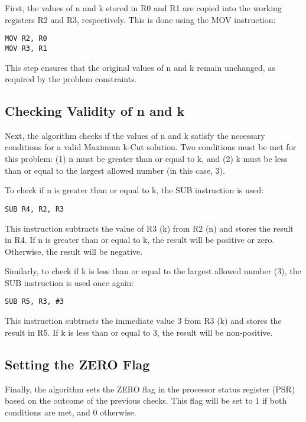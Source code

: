 First, the values of n and k stored in R0 and R1 are copied into the working registers R2 and R3, respectively. This is done using the MOV instruction:

\begin{verbatim}
MOV R2, R0
MOV R3, R1
\end{verbatim}

This step ensures that the original values of n and k remain unchanged, as required by the problem constraints.

\subsection{Checking Validity of n and k}

Next, the algorithm checks if the values of n and k satisfy the necessary conditions for a valid Maximum k-Cut solution. Two conditions must be met for this problem: (1) n must be greater than or equal to k, and (2) k must be less than or equal to the largest allowed number (in this case, 3).

To check if n is greater than or equal to k, the SUB instruction is used:

\begin{verbatim}
SUB R4, R2, R3
\end{verbatim}

This instruction subtracts the value of R3 (k) from R2 (n) and stores the result in R4. If n is greater than or equal to k, the result will be positive or zero. Otherwise, the result will be negative.

Similarly, to check if k is less than or equal to the largest allowed number (3), the SUB instruction is used once again:

\begin{verbatim}
SUB R5, R3, #3
\end{verbatim}

This instruction subtracts the immediate value 3 from R3 (k) and stores the result in R5. If k is less than or equal to 3, the result will be non-positive.

\subsection{Setting the ZERO Flag}

Finally, the algorithm sets the ZERO flag in the processor status register (PSR) based on the outcome of the previous checks. This flag will be set to 1 if both conditions are met, and 0 otherwise.

